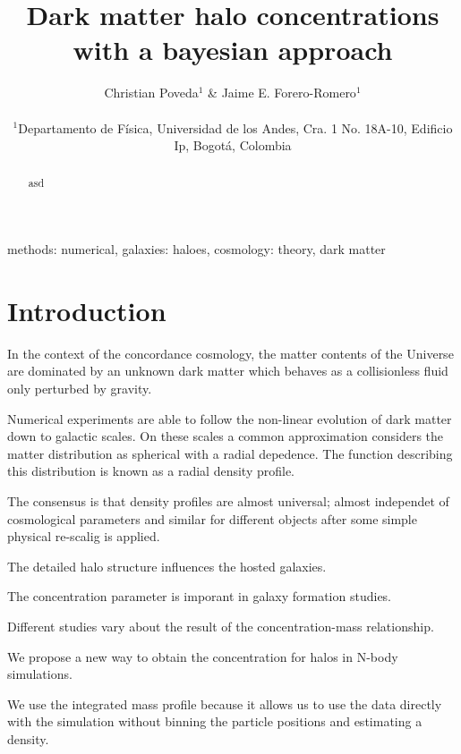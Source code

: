 \documentclass[useAMS,usenatbib]{mn2e}
\begin{document}
\title[Bayesian halo concentrations]{Dark matter halo
  concentrations with a bayesian approach}
\author[Poveda \& Forero-Romero]{
\parbox[t]{\textwidth}{\raggedright
  Christian Poveda$^{1}$ \&
  Jaime E. Forero-Romero$^{1}$
}
\vspace*{6pt}\\
$^{1}$Departamento de F\'{i}sica, Universidad de los Andes, Cra. 1
No. 18A-10, Edificio Ip, Bogot\'a, Colombia\\
}
\maketitle

\begin{abstract}
asd
\end{abstract}
\begin{keywords}
methods: numerical, galaxies: haloes, cosmology: theory, dark
matter
\end{keywords}


\section{Introduction}
\label{sec:introduction}
In the context of the concordance cosmology, the matter contents of
the Universe are dominated by an unknown dark matter which behaves as
a collisionless fluid only perturbed by gravity.

Numerical experiments are able to follow the non-linear evolution of
dark matter down to galactic scales. On these scales a common
approximation considers the matter distribution as spherical with a
radial depedence. The function describing this distribution is known
as a radial density profile. 

The consensus is that density profiles are almost universal;
almost independet of cosmological parameters and similar for different
objects after some simple physical re-scalig is applied. 

The detailed halo structure influences the hosted galaxies.

The concentration parameter is imporant in galaxy formation studies.

Different studies vary about the result of the concentration-mass
relationship.

We propose a new way to obtain the concentration for halos in N-body
simulations. 

We use the integrated mass profile because it
allows us to use the data directly with the simulation without binning
the particle positions and estimating a density.
\end{document}
